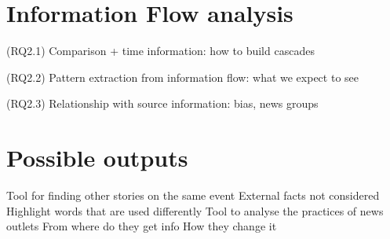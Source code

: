 \section{Information Flow analysis}

(RQ2.1) Comparison + time information: how to build cascades

(RQ2.2) Pattern extraction from information flow: what we expect to see

(RQ2.3) Relationship with source information: bias, news groups


\section{Possible outputs}


Tool for finding other stories on the same event
External facts not considered
Highlight words that are used differently
Tool to analyse the practices of news outlets
From where do they get info
How they change it
